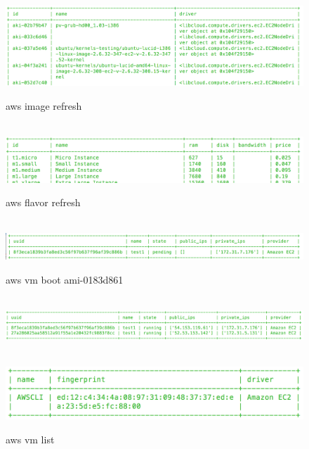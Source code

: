 \documentclass[9pt,twocolumn,twoside]{../../styles/osajnl}
\begin{document}
	
	
\begin{figure}[htb]
  \centering
  \includegraphics[width=\linewidth]{images/cms_aws_image_refresh.png}
  \vspace{-1.5\baselineskip}
  \caption{aws image refresh}
  \label{fig:imagerefresh}
~\newline
  \centering
  \includegraphics[width=\linewidth]{images/cms_aws_flavor_refresh.png}
  \vspace{-1.5\baselineskip}
  \caption{aws flavor refresh }
  \label{fig:flavorlist}
~\newline
  \centering
  \includegraphics[width=\linewidth]{images/vm_boot_ami-0183d861.png}
  \vspace{-1.5\baselineskip}
  \caption{aws vm boot ami-0183d861 }
  \label{fig:vmboot}
~\newline
  \centering
  \includegraphics[width=\linewidth]{images/vm_list.png}
  \vspace{-1.5\baselineskip}
  \caption{aws vm list }
  \label{fig:vmlist}
~\newline
  \centering
  \includegraphics[width=\linewidth]{images/cms_aws_keypair_create.png}

\end{figure}
\end{document}
